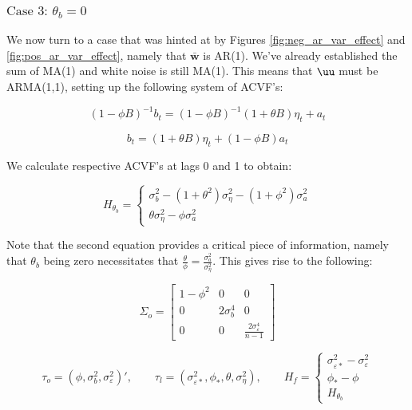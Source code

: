 
\subsubsection{$\text{Case 3: } \theta_b = 0$}
We now turn to a case that was hinted at by Figures \ref{fig:neg_ar_var_effect} and \ref{fig:pos_ar_var_effect}, namely that $\bar{\mathbf{w}}$ is AR(1). We've already established  the sum of MA(1) and white noise is still MA(1). This means that $\uu$ must be ARMA(1,1), setting up the following system of ACVF's:

$$ (1-\phi B)^{-1}b_t = (1-\phi B)^{-1}(1 + \theta B)\eta_t + a_t $$

$$ b_t = (1 + \theta B)\eta_t + (1 -\phi B)a_t $$

We calculate respective ACVF's at lags 0 and 1 to obtain:

\begin{equation}
    \label{eq:H_thetab}
    H_{\theta_b} =  \begin{cases}
    \sigma_b^2 - (1 + \theta^2)\sigma_\eta^2 - (1 + \phi^2)\sigma_a^2 \\
    \theta \sigma_\eta^2 - \phi \sigma_a^2
    \end{cases}
\end{equation}


Note that the second equation provides a critical piece of information, namely that $\theta_b$ being zero necessitates that $\frac{\theta}{\phi} = \frac{\sigma^2_{a}}{\sigma^2_{\eta}}$. This gives rise to the following:


\begin{equation}
    \label{eq:Sigma_o_thetab}
    \Sigma_o = \left[\begin{array}{ccc}
        1 - \phi^2 & 0 & 0 \\
        0 & 2\sigma_b^4 & 0 \\
        0 & 0 & \frac{2\sigma_\varepsilon^4}{n-1}
    \end{array}\right]
\end{equation}

$$ \tau_o = (\phi,\sigma_b^2, \sigma_\varepsilon^2)', \qquad \tau_l = (\sigma_{\varepsilon*}^2, \phi_*, \theta, \sigma_\eta^2), \qquad H_f = \begin{cases}
    \sigma_{\varepsilon*}^2 - \sigma_{\varepsilon}^2 \\
    \phi_* - \phi \\
    H_{\theta_b}
\end{cases} $$



